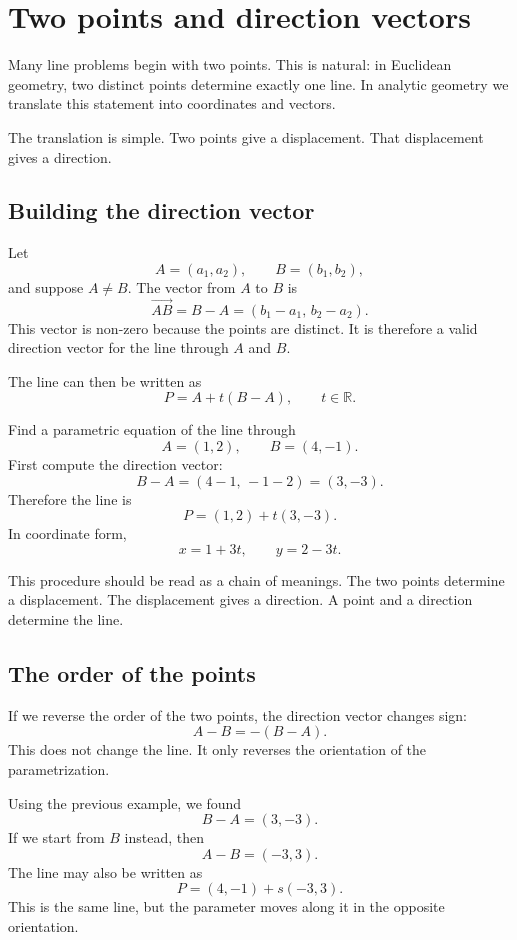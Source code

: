 \section{Two points and direction vectors}

Many line problems begin with two points. This is natural: in Euclidean geometry, two distinct points determine exactly one line. In analytic geometry we translate this statement into coordinates and vectors.

The translation is simple. Two points give a displacement. That displacement gives a direction.

\subsection*{Building the direction vector}

Let
\[
A=(a_1,a_2),
\qquad
B=(b_1,b_2),
\]
and suppose \(A\ne B\). The vector from \(A\) to \(B\) is
\[
\overrightarrow{AB}=B-A=(b_1-a_1,\,b_2-a_2).
\]
This vector is non-zero because the points are distinct. It is therefore a valid direction vector for the line through \(A\) and \(B\).

The line can then be written as
\[
P=A+t(B-A),
\qquad t\in\mathbb{R}.
\]

\begin{examplebox}
Find a parametric equation of the line through
\[
A=(1,2),
\qquad
B=(4,-1).
\]
First compute the direction vector:
\[
B-A=(4-1,\,-1-2)=(3,-3).
\]
Therefore the line is
\[
P=(1,2)+t(3,-3).
\]
In coordinate form,
\[
x=1+3t,
\qquad
y=2-3t.
\]
\end{examplebox}

This procedure should be read as a chain of meanings. The two points determine a displacement. The displacement gives a direction. A point and a direction determine the line.

\subsection*{The order of the points}

If we reverse the order of the two points, the direction vector changes sign:
\[
A-B=-(B-A).
\]
This does not change the line. It only reverses the orientation of the parametrization.

Using the previous example, we found
\[
B-A=(3,-3).
\]
If we start from \(B\) instead, then
\[
A-B=(-3,3).
\]
The line may also be written as
\[
P=(4,-1)+s(-3,3).
\]
This is the same line, but the parameter moves along it in the opposite orientation.

